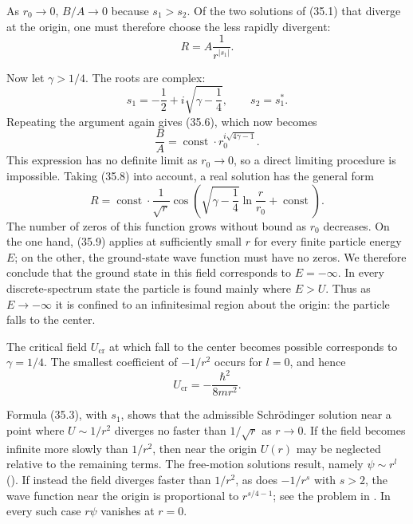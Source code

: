 As $r_0\to0$, $B/A\to0$ because $s_1>s_2$. Of the two solutions of (35.1)
that diverge at the origin, one must therefore choose the less rapidly
divergent:
\begin{equation}
  R=A\frac1{r^{|s_1|}}.
  \tag{35.7}
\end{equation}

Now let $\gamma>1/4$. The roots are complex:
\[
  s_1=-\frac12+i\sqrt{\gamma-\frac14},\qquad s_2=s_1^*.
\]
Repeating the argument again gives (35.6), which now becomes
\begin{equation}
  \frac BA=\operatorname{const}\cdot r_0^{i\sqrt{4\gamma-1}}.
  \tag{35.8}
\end{equation}
This expression has no definite limit as $r_0\to0$, so a direct limiting
procedure is impossible. Taking (35.8) into account, a real solution has the
general form
\begin{equation}
  R=\operatorname{const}\cdot\frac1{\sqrt r}
  \cos\left(\sqrt{\gamma-\frac14}\ln\frac r{r_0}
  +\operatorname{const}\right).
  \tag{35.9}
\end{equation}
The number of zeros of this function grows without bound as $r_0$ decreases.
On the one hand, (35.9) applies at sufficiently small $r$ for every finite
particle energy $E$; on the other, the ground-state wave function must have
no zeros. We therefore conclude that
the ground state in this field corresponds to $E=-\infty$. In every
discrete-spectrum state the particle is found mainly where $E>U$. Thus as
$E\to-\infty$ it is confined to an infinitesimal region about the origin:
the particle falls to the center.

The critical field $U_{\mathrm{cr}}$ at which fall to the center becomes
possible corresponds to $\gamma=1/4$. The smallest coefficient of $-1/r^2$
occurs for $l=0$, and hence
\begin{equation}
  U_{\mathrm{cr}}=-\frac{\hbar^2}{8mr^2}.
  \tag{35.10}
\end{equation}

Formula (35.3), with $s_1$, shows that the admissible Schrödinger solution
near a point where $U\sim1/r^2$ diverges no faster than $1/\sqrt r$ as
$r\to0$. If the field becomes infinite more slowly than $1/r^2$, then near
the origin $U(r)$ may be neglected relative to the remaining terms. The
free-motion solutions result, namely $\psi\sim r^l$ (). If instead the
field diverges faster than $1/r^2$, as does $-1/r^s$ with $s>2$, the wave
function near the origin is proportional to $r^{s/4-1}$; see the problem in
. In every such case $r\psi$ vanishes at $r=0$.


